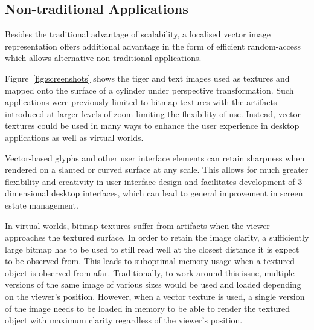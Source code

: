 \documentclass[11pt,a4paper,twoside]{article}
\begin{document}
\subsection {Non-traditional Applications}
Besides the traditional advantage of scalability, a localised vector image representation offers additional advantage in the form of efficient random-access which allows alternative non-traditional applications.

Figure~\ref{fig:screenshots} shows the tiger and text images used as textures and mapped onto the surface of a cylinder under perspective transformation. Such applications were previously limited to bitmap textures with the artifacts introduced at larger levels of zoom limiting the flexibility of use. Instead, vector textures could be used in many ways to enhance the user experience in desktop applications as well as virtual worlds.

Vector-based glyphs and other user interface elements can retain sharpness when rendered on a slanted or curved surface at any scale. This allows for much greater flexibility and creativity in user interface design and facilitates development of 3-dimensional desktop interfaces, which can lead to general improvement in screen estate management.

In virtual worlds, bitmap textures suffer from artifacts when the viewer approaches the textured surface. In order to retain the image clarity, a sufficiently large bitmap has to be used to still read well at the closest distance it is expect to be observed from. This leads to suboptimal memory usage when a textured object is observed from afar. Traditionally, to work around this issue, multiple versions of the same image of various sizes would be used and loaded depending on the viewer's position. However, when a vector texture is used, a single version of the image needs to be loaded in memory to be able to render the textured object with maximum clarity regardless of the viewer's position.

\newpage


\end{document}
